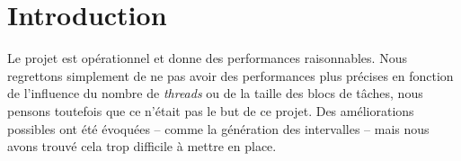\section*{Introduction} %
\label{sec:introduction}

Le projet est opérationnel et donne des performances raisonnables. Nous regrettons simplement de ne pas avoir des performances plus précises en fonction de l'influence du nombre de \emph{threads} ou de la taille des blocs de tâches, nous pensons toutefois que ce n'était pas le but de ce projet. Des améliorations possibles ont été évoquées -- comme la génération des intervalles -- mais nous avons trouvé cela trop difficile à mettre en place.

